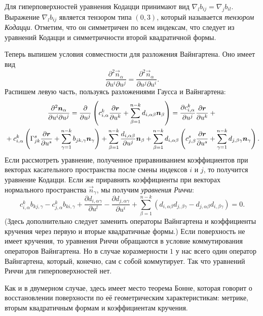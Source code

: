 Для гиперповерхностей уравнения Кодацци принимают вид $\nabla_lb_{ij} = \nabla_jb_{il}$. Выражение $\nabla_lb_{ij}$ является тензором типа $(0, 3)$, который называется \textit{тензором Кодацци}. Отметим, что он симметричен по всем индексам, что следует из уравнений Кодацци и симметричности второй квадратичной формы.

Теперь выпишем условия совместности для разложения Вайнгартена. Оно имеет вид
\[
	\frac{\partial^2\vec{n}_\alpha}{\partial u^i\partial u^j} = \frac{\partial^2\vec{n}_\alpha}{\partial u^j\partial u^i}.
\]
Распишем левую часть, пользуясь разложениями Гаусса и Вайнгартена:
\begin{multline*}
	\frac{\partial^2\boldsymbol{n}_\alpha}{\partial u^i\partial u^j} = \frac{\partial}{\partial u^j}\left(c_{i, \alpha}^k\frac{\partial\boldsymbol{r}}{\partial u^k} + \sum_{\beta = 1}^{n - k}d_{i, \alpha\beta}\boldsymbol{n}_\beta\right) = \frac{\partial c_{i, \alpha}^k}{\partial u^j}\frac{\partial\boldsymbol{r}}{\partial u^k} + {}\\{} + c_{i, \alpha}^k\left(\Gamma_{jk}^s\frac{\partial\boldsymbol{r}}{\partial u^s} + \sum_{\gamma = 1}^{n - k}b_{jk, \gamma}\boldsymbol{n}_\gamma\right) + \sum_{\beta = 1}^{n - k}\frac{d_{i, \alpha\beta}}{\partial u^j}\boldsymbol{n}_{\beta} + \sum_{\beta = 1}^{n - k}d_{i, \alpha\beta}\left(c_{j, \beta}^s\frac{\partial\boldsymbol{r}}{\partial u^s} + \sum_{\gamma = 1}^{n - k}d_{j, \beta\gamma}\boldsymbol{n}_\gamma\right).
\end{multline*}
Если рассмотреть уравнение, полученное приравниванием коэффициентов при векторах касательного пространства после смены индексов $i$ и $j$, то получится уравнение Кодацци. Если же приравнять коэффициенты при векторах нормального пространства $\vec{n}_{\gamma}$, мы получим \textit{уравнения Риччи}:
\[
	c_{i, \alpha}^kb_{kj, \gamma} - c_{j, \alpha}^kb_{ki, \gamma} + \frac{\partial d_{i, \alpha\gamma}}{\partial u^l} - \frac{\partial d_{j, \alpha\gamma}}{\partial u^i} + \sum_{\beta = 1}^{n - k}(d_{i, \alpha\beta}d_{j, \beta\gamma} - d_{j, \alpha\beta}d_{i, \beta\gamma}) = 0.
\]
(Здесь дополнительно следует заменить операторы Вайнгартена и коэффициенты кручения через первую и вторые квадратичные формы.) Если поверхность не имеет кручения, то уравнения Риччи обращаются в условие коммутирования операторов Вайнгартена. Но в случае коразмерности $1$ у нас всего один оператор Вайнгартена, который, конечно, сам с собой коммутирует. Так что уравнений Риччи для гиперповерхностей нет.

Как и в двумерном случае, здесь имеет место теорема Бонне, которая говорит о восстановлении поверхности по её геометрическим характеристикам: метрике, вторым квадратичным формам и коэффициентам кручения.


